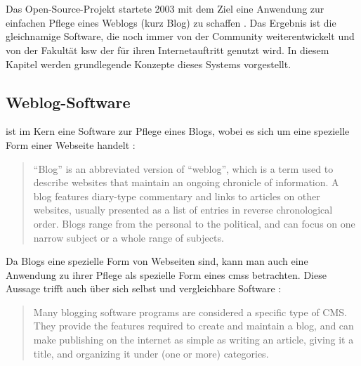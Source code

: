 \section{\wordpress}
    \label{section:WordPress}
    Das Open-Source-Projekt {\wordpress} startete 2003
    mit dem Ziel eine Anwendung zur einfachen Pflege eines Weblogs
    (kurz Blog) zu schaffen \cite{wordpress:About}.
    Das Ergebnis ist die gleichnamige Software,
    die noch immer von der Community weiterentwickelt
    und von der Fakultät \gls{ksw} der {\fernUni} für ihren
    Internetauftritt genutzt wird.
    In diesem Kapitel werden grundlegende Konzepte dieses Systems vorgestellt.

    \subsection{Weblog-Software}
        \label{section:weblogSoftware}
        {\wordpress} ist im Kern eine Software zur Pflege eines Blogs,
        wobei es sich um eine spezielle Form einer Webseite handelt
        \cite{wordpress:Blogging}:

        \begin{quote}
            "`Blog"' is an abbreviated version of "`weblog"',
            which is a term used to describe websites that maintain
            an ongoing chronicle of information.
            A blog features diary-type commentary and links to articles
            on other websites, usually presented as a list of entries in
            reverse chronological order.
            Blogs range from the personal to the political,
            and can focus on one narrow subject or a whole range of subjects.
        \end{quote}

        Da Blogs eine spezielle Form von Webseiten sind,
        kann man auch eine Anwendung zu ihrer Pflege als
        spezielle Form eines \glspl{cms} betrachten.
        Diese Aussage trifft {\wordpress} auch über sich selbst
        und vergleichbare Software \cite{wordpress:Blogging}:

        \begin{quote}
            Many blogging software programs are considered a specific type of CMS.
            They provide the features required to create and maintain a blog,
            and can make publishing on the internet as simple as writing an article,
            giving it a title, and organizing it under (one or more) categories.
        \end{quote}

